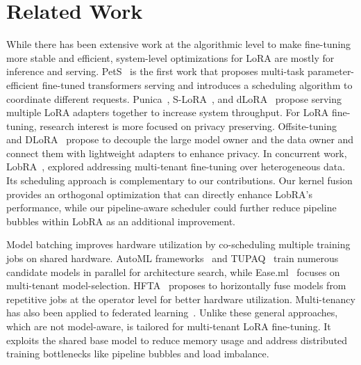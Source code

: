 \section{Related Work}
\label{sec:related-work}

\sloppy

While there has been extensive work at the algorithmic level to make fine-tuning more stable and efficient, system-level optimizations for LoRA are mostly for inference and serving. 
PetS~\cite{zhou2022pets} is the first work that proposes multi-task parameter-efficient fine-tuned transformers serving and introduces a scheduling algorithm to coordinate different requests. Punica~\cite{chen2024punica}, S-LoRA~\cite{sheng2023s-lora}, and dLoRA~\cite{wu2024dlora} propose serving multiple LoRA adapters together to increase system throughput.
For LoRA fine-tuning, research interest is more focused on privacy preserving.
Offsite-tuning~\cite{xiao2023offsite} and DLoRA~\cite{gao2024Dlora-privacy} propose to decouple the large model owner and the data owner and connect them with lightweight adapters to enhance privacy.
In concurrent work, LobRA~\cite{lin2025lobra}, explored addressing multi-tenant fine-tuning over heterogeneous data. Its scheduling approach is complementary to our contributions. Our kernel fusion provides an orthogonal optimization that can directly enhance LobRA's performance, while our pipeline-aware scheduler could further reduce pipeline bubbles within LobRA as an additional improvement.

Model batching improves hardware utilization by co-scheduling multiple training jobs on shared hardware. 
AutoML frameworks~\cite{feurer-neurips15a,feurer-arxiv20a} and TUPAQ~\cite{sparks2015automating} train numerous candidate models in parallel for architecture search, while Ease.ml~\cite{li2018easeml} focuses on multi-tenant model-selection. 
HFTA~\cite{wang2021hfta} proposes to horizontally fuse models from repetitive jobs at the operator level for better hardware utilization.
Multi-tenancy has also been applied to federated learning~\cite{zhuang2022smart-multi-tenant-federated-learning}. 
Unlike these general approaches, which are not model-aware, \Name is tailored for multi-tenant LoRA fine-tuning. 
It exploits the shared base model to reduce memory usage and address distributed training bottlenecks like pipeline bubbles and load imbalance.


